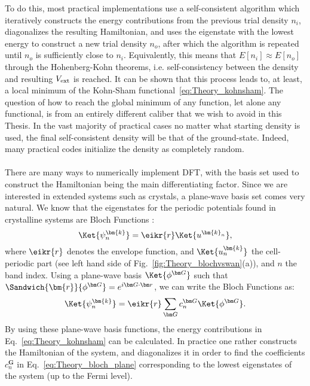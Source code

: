 To do this, most practical implementations use a self-consistent algorithm which iteratively constructs the energy contributions from the previous trial density $n_i$, diagonalizes the resulting Hamiltonian, and uses the eigenstate with the lowest energy to construct a new trial density $n_o$, after which the algorithm is repeated until $n_o$ is sufficiently close to $n_i$. Equivalently, this means that $E[n_i] \approx E[n_o]$ through the Hohenberg-Kohn theorems, i.e. self-consistency between the density and resulting $V_{\rm ext}$ is reached.
It can be shown that this process leads to, at least, a local minimum of the Kohn-Sham functional~\eqref{eq:Theory_kohnsham}.
The question of how to reach the global minimum of any function, let alone any functional, is from an entirely different caliber that we wish to avoid in this Thesis.
In the vast majority of practical cases no matter what starting density is used, the final self-consistent density will be that of the ground-state. Indeed, many practical codes initialize the density as completely random. 
\\\\
There are many ways to numerically implement DFT, with the basis set used to construct the Hamiltonian being the main differentiating factor.
Since we are interested in extended systems such as crystals, a plane-wave basis set comes very natural.
We know that the eigenstates for the periodic potentials found in crystalline systems are Bloch Functions \cite{Ashcroft}:
\begin{equation}
	\Ket{\psi^{\bm{k}}_n} = \eikr{r} \Ket{u^{\bm{k}_n}},
\end{equation}
where $\eikr{r}$ denotes the envelope function, and $\Ket{u^{\bm{k}}_n}$ the cell-periodic part (see left hand side of Fig.~\ref{fig:Theory_blochvswan}(a)), and $n$ the band index.
Using a plane-wave basis $\Ket{\phi^{\bm G}}$ such that $\Sandwich{\bm{r}}{\phi^{\bm G}} = e^{i\bm G \cdot \bm r}$, we can write the Bloch Functions as:
\begin{equation}
	\label{eq:Theory_bloch_plane}
\Ket{\psi_n^{\bm{k}}} = \eikr{r} \sum_{\bm G} c_n^{\bm G} \Ket{\phi^{\bm G}}.
\end{equation}
By using these plane-wave basis functions, the energy contributions in Eq.~\eqref{eq:Theory_kohnsham} can be calculated.
In practice one rather constructs the Hamiltonian of the system, and diagonalizes it in order to find the coefficients $c_n^{\bm G}$ in Eq.~\eqref{eq:Theory_bloch_plane} corresponding to the lowest eigenstates of the system (up to the Fermi level).
